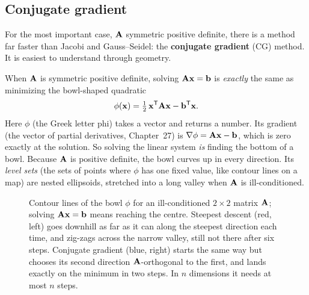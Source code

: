 \subsection{Conjugate gradient}

For the most important case, $\mathbf{A}$ symmetric positive definite, there is a method
far faster than Jacobi and Gauss--Seidel: the \textbf{conjugate gradient} (CG) method.
It is easiest to understand through geometry.

When $\mathbf{A}$ is symmetric positive definite, solving $\mathbf{A}\mathbf{x}=\mathbf{b}$ is
\emph{exactly} the same as minimizing the bowl-shaped quadratic
\[
  \phi(\mathbf{x}) = \tfrac12\,\mathbf{x}^{\mathsf{T}}\mathbf{A}\mathbf{x} - \mathbf{b}^{\mathsf{T}}\mathbf{x}.
\]
Here $\phi$ (the Greek letter phi) takes a vector and returns a number. Its gradient
(the vector of partial derivatives, Chapter~27) is $\nabla\phi = \mathbf{A}\mathbf{x}-\mathbf{b}$,
which is zero exactly at the solution. So solving the linear system \emph{is} finding the
bottom of a bowl. Because $\mathbf{A}$ is positive definite, the bowl curves up in every
direction. Its \emph{level sets} (the sets of points where $\phi$ has one fixed value,
like contour lines on a map) are nested ellipsoids, stretched into a long valley when
$\mathbf{A}$ is ill-conditioned.

\begin{figure}[htbp]
\centering
{}
\caption{Contour lines of the bowl $\phi$ for an ill-conditioned $2\times 2$ matrix
$\mathbf{A}$; solving $\mathbf{A}\mathbf{x}=\mathbf{b}$ means reaching the centre. Steepest descent
(red, left) goes downhill as far as it can along the steepest direction each time, and
zig-zags across the narrow valley, still not there after six steps. Conjugate gradient
(blue, right) starts the same way but chooses its second direction $\mathbf{A}$-orthogonal
to the first, and lands exactly on the minimum in two steps. In $n$ dimensions it needs
at most $n$ steps.}
\label{ch33:cg}
\end{figure}

